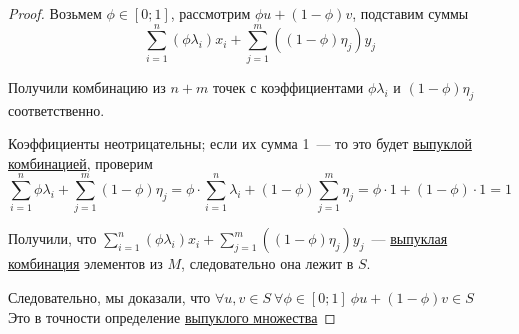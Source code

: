 \begin{proof}
  Возьмем $\phi \in [0;1]$, рассмотрим $\phi u + (1-\phi) v$, подставим суммы
  \[
   \sum\limits_{i=1}^n (\phi \lambda_i) x_i + \sum\limits_{j=1}^m ((1-\phi)\eta_j)y_j
  \]

  Получили комбинацию из $n+m$ точек с коэффициентами $\phi\lambda_i$ и $(1-\phi)\eta_j$ соответственно.

  Коэффициенты неотрицательны; если их сумма 1~--- то это будет \hyperref[note:8583F986-A6E8-4BBB-B2FB-BA0E9BBE58BF]{выпуклой комбинацией}, проверим
  \[
  \sum\limits_{i=1}^n \phi \lambda_i + \sum\limits_{j=1}^m (1-\phi) \eta_j = \phi \cdot \sum\limits_{i=1}^n \lambda_i + (1-\phi) \sum\limits_{j=1}^m \eta_j = \phi \cdot 1 + (1-\phi) \cdot 1 = 1
  \]

  Получили, что $\sum\limits_{i=1}^n (\phi \lambda_i) x_i + \sum\limits_{j=1}^m ((1-\phi)\eta_j)y_j$~--- \hyperref[note:8583F986-A6E8-4BBB-B2FB-BA0E9BBE58BF]{выпуклая комбинация} элементов из $M$, следовательно она лежит в $S$.

  Следовательно, мы доказали, что $\forall u, v \in S\ \forall \phi \in [0; 1]\ \phi u + (1-\phi) v \in S$ \\
  Это в точности определение \hyperref[note:316B5BFA-8B9F-4267-9086-D6593AAB5F9B]{выпуклого множества}
\end{proof}

